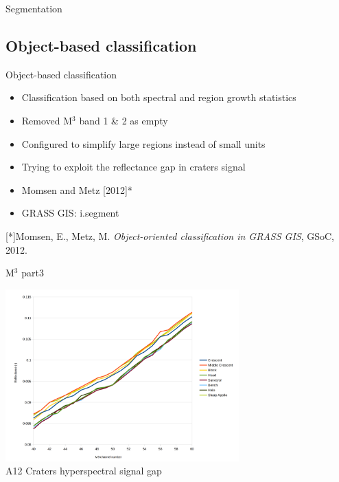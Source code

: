 \documentclass[aspectratio=169,unknownkeysallowed,xcolor=dvipsnames,beamer]{beamer} %
\begin{document}
\begin{frame}[fragile]{Segmentation}
\subsection{Object-based classification}
\begin{block}{Object-based classification}
\begin{itemize}
\item Classification based on both spectral and region growth statistics
\item Removed M$^3$ band 1 \& 2 as empty
\item Configured to simplify large regions instead of small units
\item Trying to exploit the reflectance gap in craters signal
\item Momsen and Metz [2012]* 
\item GRASS GIS: i.segment
\end{itemize}
\end{block}
[*]{\small Momsen, E., Metz, M. \textit{Object-oriented classification in GRASS GIS}, GSoC, 2012.}
\end{frame}


\begin{frame}[fragile]{M$^3$ part3}
\begin{center}
  \includegraphics[width=9cm]{images/fig5}\\
  A12 Craters hyperspectral signal gap
  \end{center}
\end{frame}
\end{document}
